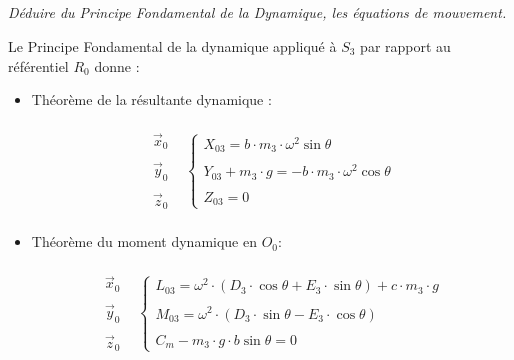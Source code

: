 \documentclass[10pt,fleqn]{article} %
\begin{document}
\subparagraph{}\textit{Déduire du Principe Fondamental de la Dynamique, les équations de mouvement.}

Le Principe Fondamental de la dynamique appliqué à $S_3$ par rapport au référentiel $R_0$ donne :

\begin{itemize}
\item Théorème de la résultante dynamique : 

\begin{align*}
\begin{array}{cc}
\begin{array}{c}
\overrightarrow{x}_0\\
\\
\overrightarrow{y}_0\\
\\
\overrightarrow{z}_0
\end{array}
&
\left\{
\begin{array}{c}
X_{03}=b\cdot m_3\cdot \omega^2\sin\theta\\
\\
Y_{03}+m_3\cdot g=-b\cdot m_3\cdot \omega^2\cos\theta\\
\\
Z_{03}=0
\end{array}
\right.
\end{array}
\end{align*}
\item Théorème du moment dynamique en $O_0$: 

\begin{align*}
\begin{array}{cc}
\begin{array}{c}
\overrightarrow{x}_0\\
\\
\overrightarrow{y}_0\\
\\
\overrightarrow{z}_0
\end{array}
&
\left\{
\begin{array}{c}
L_{03}=\omega^2\cdot \left(D_3\cdot\cos\theta+E_3\cdot\sin\theta\right)+c\cdot m_3\cdot g\\
\\
M_{03}=\omega^2\cdot\left(D_3\cdot\sin\theta-E_3\cdot\cos\theta\right)\\
\\
C_m-m_3\cdot g\cdot b\sin\theta=0
\end{array}
\right.
\end{array}
\end{align*}
\end{itemize}

\end{document}
